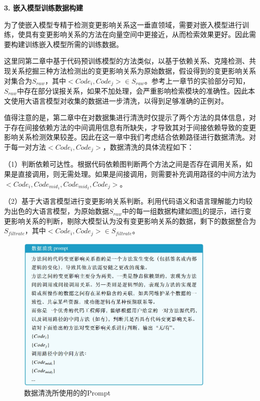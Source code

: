 \noindent \textbf{3. 嵌入模型训练数据构建}

为了使嵌入模型专精于检测变更影响关系这一垂直领域，需要对嵌入模型进行训练，使具有变更影响关系的方法在向量空间中更接近，从而检索效果更好。因此需要构建训练嵌入模型所需的训练数据。

这里同第二章中基于代码预训练模型的方法类似，以基于依赖关系、克隆检测、共现关系挖掘三种方法检测出的变更影响关系为原始数据，假设得到的变更影响关系对集合为$S_{raw}$，其中$<Code_i,Code_j>\in S_{raw}$。参考上一章节的实验部分可知，$S_{raw}$中存在部分误报关系，如果不加处理，会严重影响检索模块的准确性。因此本文使用大语言模型对收集的数据进一步清洗，以得到足够准确的正例对。

值得注意的是，第二章中在对数据集进行清洗时仅提示了两个方法的具体信息，对于存在间接依赖方法的中间调用信息有所缺失，才导致其对于间接依赖导致的变更影响关系检测效果较差。因此在这一章中我们考虑结合依赖路径进行数据清洗。对于每一对方法$<Code_i,Code_j>$，数据清洗的具体流程如下：


（1）判断依赖可达性。根据代码依赖图判断两个方法之间是否存在调用关系，如果是直接调用，则无需处理。如果是间接调用，则需要补充调用路径的中间方法为$<Code_i,Code_{mid_1},Code_{mid_2},Code_j>$。

（2）基于大语言模型进行变更影响关系判断。利用代码语义和语言理解能力均较为出色的大语言模型，为原始数据$S_{raw}$中的每一组数据构建如图\ref{2_数据清洗prompt}的提示，进行变更影响关系的判断，剔除大模型认为没有变更影响关系的数据，剩下的数据整合为$S_{filtrate}$，其中$<Code_i,Code_j>\in S_{filtrate}$。

\begin{figure}[htbp]
\centering
\includegraphics[width = 0.85\textwidth]{figures/2_数据清洗prompt.png}
\caption{数据清洗所使用的的Prompt}
\label{2_数据清洗prompt}
\end{figure}

